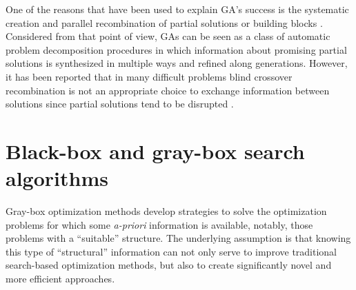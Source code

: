   
 One of the reasons that have been used to explain GA's success is the systematic creation and parallel recombination of partial solutions or building blocks \cite{Goldberg:1989}. Considered from that point of view, GAs can be seen as a class of automatic problem decomposition procedures in which information about promising partial solutions is synthesized in multiple ways and refined along generations. However, it has been reported that in many difficult problems blind crossover recombination is not an appropriate choice to exchange information between solutions since partial solutions tend to be disrupted \cite{Watson_et_al:1998}.

 
 


 \section{Black-box and gray-box search algorithms}   \label{sec:BLACK_VS_GRAY}


 
 Gray-box optimization methods \cite{Chicano_et_2014,Whitley:2015}  develop strategies to solve the optimization problems for which some \emph{a-priori} information is available, notably, those problems with a  ``suitable'' structure. The underlying assumption is that knowing this type of ``structural'' information can not only serve to improve traditional search-based optimization methods, but also to create significantly novel and more efficient approaches.

